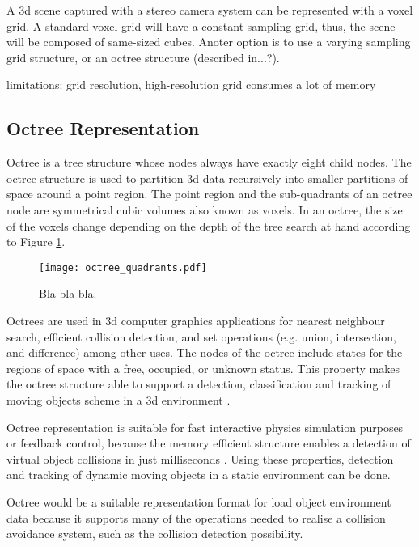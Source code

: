 \documentclass[12pt,a4paper,oneside,pdftex]{report}
\begin{document}
A 3d scene captured with a stereo camera system can be represented with a voxel grid. A standard voxel grid will have a constant sampling grid, thus, the scene will be composed of same-sized cubes. Anoter option is to use a varying sampling grid structure, or an octree structure (described in...?).

limitations: grid resolution, high-resolution grid consumes a lot of memory

\subsection{Octree Representation}
\label{subsection:octree_representation}

Octree is a tree structure whose nodes always have exactly eight child nodes. The octree structure is used to partition 3d data recursively into smaller partitions of space around a point region. The point region and the sub-quadrants of an octree node are symmetrical cubic volumes also known as voxels. In an octree, the size of the voxels change depending on the depth of the tree search at hand according to Figure \ref{fig:octree_quadrants}.

\begin{figure}[ht]
  \begin{center}
    \texttt{[image: octree\_quadrants.pdf]}
    \caption{Bla bla bla.}
    \label{fig:octree_quadrants}
  \end{center}
\end{figure}

Octrees are used in 3d computer graphics applications for nearest neighbour search, efficient collision detection, and set operations (e.g. union, intersection, and difference) among other uses. The nodes of the octree include states for the regions of space with a free, occupied, or unknown status. This property makes the octree structure able to support a detection, classification and tracking of moving objects scheme in a 3d environment \citep{Azim12, Ouyang12}.

Octree representation is suitable for fast interactive physics simulation purposes or feedback control, because the memory efficient structure enables a detection of virtual object collisions in just milliseconds \citep{Noborio99}. Using these properties, detection and tracking of dynamic moving objects in a static environment can be done.

Octree would be a suitable representation format for load object environment data because it supports many of the operations needed to realise a collision avoidance system, such as the collision detection possibility.
\end{document}
